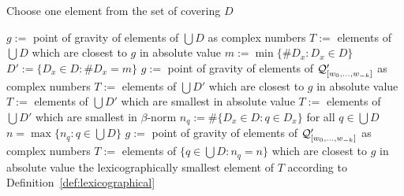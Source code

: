 \begin{algorithm}
   \caption{Choose one element from the set of covering $D$ }
   \label{alg:pickElement}   
  \begin{algorithmic}[1]
    	\STATE $g:=$ point of gravity of elements of $\bigcup D$ as complex numbers
    	\STATE $T:=$ elements of $\bigcup D$ which are closest to $g$ in absolute value
    	\STATE $m:=\min\{\#D_x \colon D_x\in D \}$
    	\STATE $D':=\{D_x \in D \colon \#D_x=m\}$
    		\STATE $g:=$ point of gravity of elements of $\mathcal{Q}_{[w_{0}, \dots, w_{-k}]}'$ as complex numbers
    		\STATE $T:=$ elements of $\bigcup D'$ which are closest to $g$ in absolute value
			\STATE $T:=$ elements of $\bigcup D'$ which are smallest in absolute value
			\STATE $T:=$ elements of $\bigcup D'$ which are smallest in $\beta$-norm
    	\ENDIF
    	\STATE $n_q:=\#\{D_x\in D\colon q\in D_x\}$ for all $q\in \bigcup D$
    	\STATE $n=\max\{n_q\colon q\in \bigcup D \}$
    	\STATE $g:=$ point of gravity of elements of $\mathcal{Q}_{[w_{0}, \dots, w_{-k}]}'$ as complex numbers
    	\STATE $T:=$ elements of $\{q \in \bigcup D \colon n_q=n\}$ which are closest to $g$ in absolute value
    \ENDIF    
    \RETURN the lexicographically smallest element of $T$ according to Definition~\ref{def:lexicographical}

  \end{algorithmic}
\end{algorithm}


